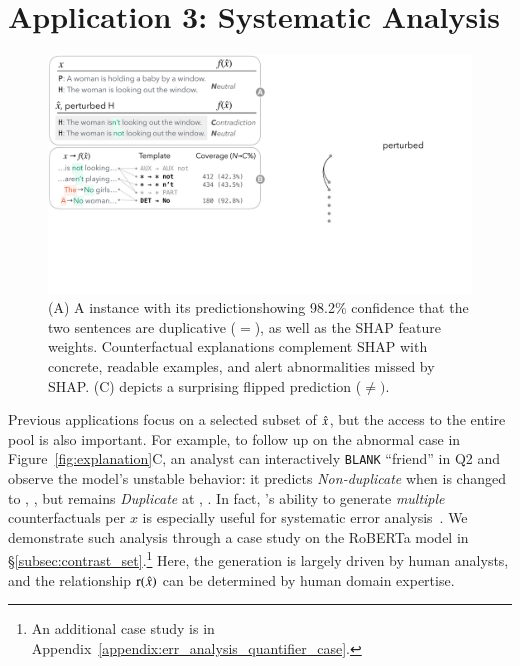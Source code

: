 \section{Application 3: Systematic Analysis}
\label{sec:app_err_analysis}


\begin{figure}[t]
\centering
\includegraphics[trim={0 13cm 33cm 0cm},clip,width=1\columnwidth]{figures/err_analysis.pdf}
\vspace{-15pt}
\caption{
(A) A \qqp instance with its prediction\footnotemark showing 98.2\% confidence that the two sentences are duplicative ($=$), as well as the SHAP feature weights.
Counterfactual explanations complement SHAP with concrete, readable examples, and alert abnormalities missed by SHAP. \eg (C)
depicts a surprising flipped prediction ($\neq)$.
}
\vspace{-10pt}
\label{fig:err_analysis}
\end{figure}


Previous applications focus on a selected subset of $\hat{x}$, but the access to the entire pool is also important.
For example, to follow up on the abnormal case in Figure~\ref{fig:explanation}C, an analyst can interactively \texttt{BLANK} ``friend'' in Q2 and observe the model's unstable behavior: it predicts \emph{Non-duplicate} when  is changed to , , but remains \emph{Duplicate} at , .
In fact, \sysname's ability to generate \emph{multiple} counterfactuals per $x$ is especially useful for systematic error analysis~\cite{wu2019errudite}.
We demonstrate such analysis through a case study on the \nli RoBERTa model in \S\ref{subsec:contrast_set}.\footnote{An additional case study is in Appendix~\ref{appendix:err_analysis_quantifier_case}.}
Here, the generation is largely driven by human analysts, and the relationship $\operatorname*{r}(\hat{x})$ can be determined by human domain expertise.

